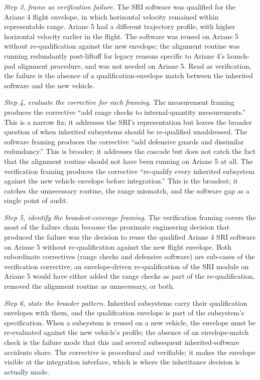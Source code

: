 \begin{exercise}
\textit{Step 3, frame as verification failure.} The SRI software was
qualified for the Ariane 4 flight envelope, in which horizontal
velocity remained within representable range. Ariane 5 had a
different trajectory profile, with higher horizontal velocity
earlier in the flight. The software was reused on Ariane 5 without
re-qualification against the new envelope; the alignment routine
was running redundantly post-liftoff for legacy reasons specific to
Ariane 4's launch-pad alignment procedure, and was not needed on
Ariane 5. Read as verification, the failure is the absence of a
qualification-envelope match between the inherited software and the
new vehicle.

\textit{Step 4, evaluate the corrective for each framing.} The
measurement framing produces the corrective ``add range checks to
internal-quantity measurements.'' This is a narrow fix; it addresses
the SRI's representation but leaves the broader question of when
inherited subsystems should be re-qualified unaddressed. The software
framing produces the corrective ``add defensive guards and dissimilar
redundancy.'' This is broader; it addresses the cascade but does not
catch the fact that the alignment routine should not have been
running on Ariane 5 at all. The verification framing produces the
corrective ``re-qualify every inherited subsystem against the new
vehicle envelope before integration.'' This is the broadest; it
catches the unnecessary routine, the range mismatch, and the
software gap as a single point of audit.

\textit{Step 5, identify the broadest-coverage framing.} The
verification framing covers the most of the failure chain because the
proximate engineering decision that produced the failure was the
decision to reuse the qualified Ariane 4 SRI software on Ariane 5
without re-qualification against the new flight envelope. Both subordinate
correctives (range checks and defensive software) are sub-cases of
the verification corrective; an envelope-driven re-qualification of
the SRI module on Ariane 5 would have either added the range checks
as part of the re-qualification, removed the alignment routine as
unnecessary, or both.

\textit{Step 6, state the broader pattern.} Inherited subsystems
carry their qualification envelopes with them, and the qualification
envelope is part of the subsystem's specification. When a subsystem
is reused on a new vehicle, the envelope must be re-evaluated against
the new vehicle's profile; the absence of an envelope-match check is
the failure mode that this and several subsequent inherited-software
accidents share. The corrective is procedural and verifiable; it
makes the envelope visible at the integration interface, which is
where the inheritance decision is actually made.
\end{exercise}

